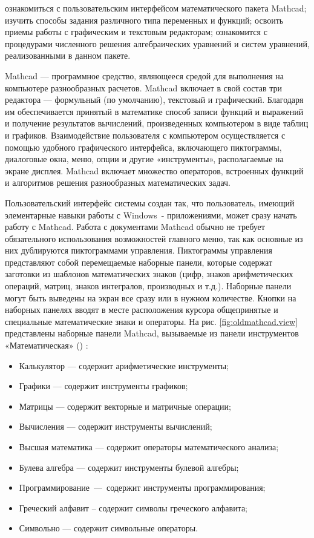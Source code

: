 
\goal ознакомиться с пользовательским интерфейсом математического пакета Mathcad; изучить способы задания различного типа переменных и функций; освоить приемы работы с графическим и текстовым редакторам; ознакомится с процедурами численного решения алгебраических уравнений и систем уравнений, реализованными в данном пакете.

Mathcad --- программное средство, являющееся средой для выполнения на компьютере разнообразных расчетов. Mathcad включает в свой состав три редактора --- формульный (по умолчанию), текстовый и графический. Благодаря им обеспечивается принятый в математике способ записи функций и выражений и получение результатов вычислений, произведенных компьютером в виде таблиц и графиков. Взаимодействие пользователя с компьютером осуществляется с помощью удобного графического интерфейса, включающего пиктограммы, диалоговые окна, меню, опции и другие «инструменты», располагаемые на экране дисплея. Mathcad включает множество операторов, встроенных функций и алгоритмов решения разнообразных математических задач.

Пользовательский интерфейс системы создан так, что пользователь, имеющий элементарные навыки работы с Windows~- приложениями, может сразу начать работу с Mathcad. Работа с документами Mathcad обычно не требует обязательного использования возможностей главного меню, так как основные из них дублируются пиктограммами управления. Пиктограммы управления представляют собой перемещаемые наборные панели, которые содержат заготовки из шаблонов математических знаков (цифр, знаков арифметических операций, матриц, знаков интегралов, производных и т.д.). Наборные панели могут быть выведены на экран все сразу или в нужном количестве. Кнопки на наборных панелях вводят в месте расположения курсора общепринятые и специальные математические знаки и операторы. На рис. \ref{fig:oldmathcad.view} представлены наборные панели Mathcad, вызываемые из панели инструментов «Математическая» () :
\begin{itemize}
\item Калькулятор --- содержит арифметические инструменты;
\item Графики --- содержит инструменты графиков;
\item Матрицы --- содержит векторные и матричные операции;
\item Вычисления --- содержит инструменты вычислений;
\item Высшая математика --- содержит операторы математического анализа;
\item Булева алгебра --- содержит инструменты булевой алгебры;
\item Программирование --- содержит инструменты программирования;
\item Греческий алфавит – содержит символы греческого алфавита;
\item Символьно --- содержит символьные операторы.
\end{itemize}

